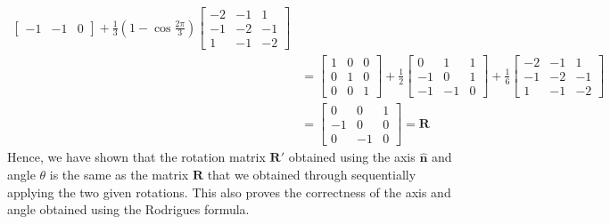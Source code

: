 \documentclass[10pt]{article}
\newcommand{\unit}[1]{\mathbf{\hat{#1}}}
\begin{document}
\begin{enumerate}
\begin{align*}
\begin{bmatrix}
                -1 & -1 & 0
            \end{bmatrix} + \frac{1}{3} \left(1 - \cos{\frac{2\pi}{3}} \right) \begin{bmatrix}
                -2 & -1 & 1 \\
                -1 & -2 & -1 \\
                1 & -1 & -2
            \end{bmatrix} \\
            &= \begin{bmatrix}
                1 & 0 & 0 \\
                0 & 1 & 0 \\
                0 & 0 & 1
            \end{bmatrix} + \frac{1}{2} \begin{bmatrix}
                0 & 1 & 1 \\
                -1 & 0 & 1 \\
                -1 & -1 & 0
            \end{bmatrix} + \frac{1}{6} \begin{bmatrix}
                -2 & -1 & 1 \\
                -1 & -2 & -1 \\
                1 & -1 & -2
            \end{bmatrix} \\
            &= \begin{bmatrix}
                0 & 0 & 1 \\
                -1 & 0 & 0 \\
                0 & -1 & 0
            \end{bmatrix} = \mathbf{R}
        \end{align*}
        Hence, we have shown that the rotation matrix $\mathbf{R'}$ obtained using the axis
        $\unit{n}$ and angle $\theta$ is the same as the matrix $\mathbf{R}$ that we obtained
        through sequentially applying the two given rotations. This also proves the correctness
        of the axis and angle obtained using the Rodrigues formula.
    \end{enumerate}
\end{document}
